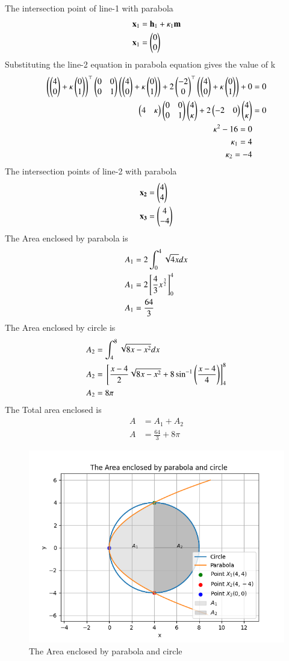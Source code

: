 \documentclass[journal]{IEEEtran}
\begin{document}
The intersection point of line-1 with parabola
\begin{align}
    \mathbf{x}_1 &= \mathbf{h}_1 + \kappa_1\mathbf{m}\\
    \mathbf{x}_1 &= \begin{pmatrix}0 \\ 0\end{pmatrix}
\end{align}
Substituting the line-2 equation in parabola equation gives the value of k
\begin{align}
    \left(\begin{pmatrix}4\\0\end{pmatrix}+\kappa\begin{pmatrix}0\\1\end{pmatrix}\right)^\top\begin{pmatrix}0 & 0\\0 & 1\end{pmatrix}\left(\begin{pmatrix}4\\0\end{pmatrix}+\kappa\begin{pmatrix}0\\1\end{pmatrix}\right) + 2\begin{pmatrix}-2\\0\end{pmatrix}^\top\left(\begin{pmatrix}4\\0\end{pmatrix}+\kappa\begin{pmatrix}0\\1\end{pmatrix}\right) + 0 &= 0\\
\begin{pmatrix}4&\kappa\end{pmatrix}\begin{pmatrix}0&0\\0&1\end{pmatrix}\begin{pmatrix}4\\\kappa\end{pmatrix}+2\begin{pmatrix}-2&0\end{pmatrix}\begin{pmatrix}4\\\kappa\end{pmatrix} &= 0\\
\kappa^2 - 16 = 0 \\
\kappa_1 = 4 \\
\kappa_2 = -4
\end{align}
The intersection points of line-2 with parabola 
\begin{align}
\mathbf{x_2} &= \begin{pmatrix}4\\4\end{pmatrix}\\
\mathbf{x_3} &= \begin{pmatrix}4\\-4\end{pmatrix}
\end{align}
The Area enclosed by parabola is 
\begin{align}
    A_1 &= 2\int_{0}^{4}\sqrt{4x}dx \\
    A_1 &= 2{}\left[\frac{4}{3} x^{\frac{3}{2}}\right]_{0}^{4} \\ 
    A_1 &= \frac{64}{3}
\end{align}
The Area enclosed by circle is 
\begin{align}
    A_2 &= \int_{4}^{8}\sqrt{8x - x^2}dx \\
    A_2 &= {}\left[\frac{x-4}{2}\sqrt{8x - x^2} + 8 \sin^{-1}\left(\frac{x-4}{4}\right)\right]_4^8 \\
    A_2 &= 8\pi
\end{align}
The Total area enclosed is 
\begin{align}
    A &= A_1 + A_2\\
    A &= \frac{64}{3} + 8\pi
\end{align}
\begin{figure}[h!]
   \centering
   \includegraphics[width = .62\linewidth]{figs/fig.png}
   \caption{The Area enclosed by parabola and circle}
   \label{stemplot}
   \end{figure}
\end{document}
